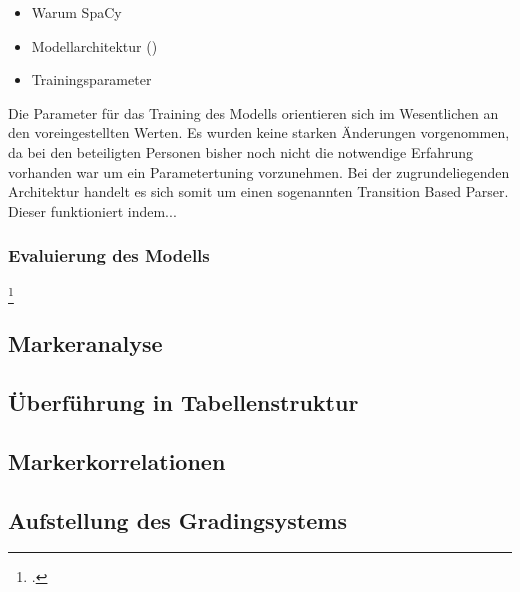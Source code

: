 \begin{itemize}
    \item Warum SpaCy
    \item Modellarchitektur ()
    \item Trainingsparameter
\end{itemize}

Die Parameter für das Training des Modells orientieren sich im Wesentlichen an den voreingestellten Werten. Es wurden keine starken Änderungen vorgenommen, da bei den beteiligten Personen bisher noch nicht die notwendige Erfahrung vorhanden war um ein Parametertuning vorzunehmen.
Bei der zugrundeliegenden Architektur handelt es sich somit um einen sogenannten Transition Based Parser. Dieser funktioniert indem...

\subsubsection{Evaluierung des Modells}
\footcite[]{tsai2006}

\subsection{Markeranalyse}
\subsection{Überführung in Tabellenstruktur}
\subsection{Markerkorrelationen}
\subsection{Aufstellung des Gradingsystems}
